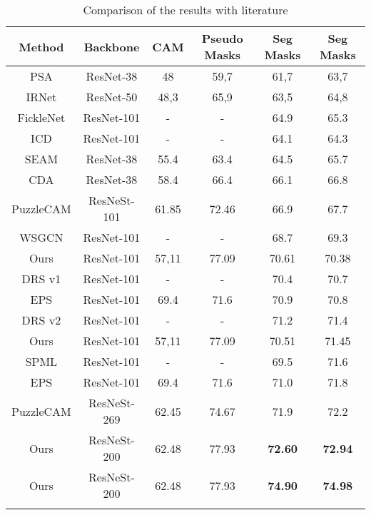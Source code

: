 \documentclass[sn-mathphys]{sn-jnl}
\theoremstyle{thmstyleone}
\theoremstyle{thmstyletwo}\newtheorem{example}{Example}\newtheorem{remark}{Remark}
\theoremstyle{thmstylethree}\newtheorem{definition}{Definition}
\begin{document}
\begin{table}[!ht]
\begin{center}
\begin{minipage}{\textwidth}
\caption{Comparison of the results with literature}\label{sota}\begin{tabular*}{\textwidth}{@{\extracolsep{\fill}}cccccc@{\extracolsep{\fill}}}
\toprule Method & Backbone  & CAM\footnotemark[1] & Pseudo Masks\footnotemark[1] & Seg Masks\footnotemark[2] & Seg Masks\footnotemark[3] \\
\midrule
PSA & ResNet-38  & 48 & 59,7 & 61,7 & 63,7 \\
IRNet & ResNet-50  & 48,3 & 65,9 & 63,5 & 64,8 \\
FickleNet & ResNet-101  & - & - & 64.9 & 65.3\\ 
ICD & ResNet-101  & - & - & 64.1 & 64.3\\
SEAM & ResNet-38  & 55.4 & 63.4 & 64.5 & 65.7\\
CDA & ResNet-38 & 58.4 & 66.4 & 66.1 & 66.8 \\
PuzzleCAM & ResNeSt-101 & 61.85 & 72.46 & 66.9 & 67.7 \\
WSGCN & ResNet-101 & - & - & 68.7 & 69.3 \\
Ours\footnotemark[4] & ResNet-101 & 57,11 & 77.09 & 70.61 & 70.38 \\
DRS v1\footnotemark[4] & ResNet-101 &  - & - & 70.4 & 70.7 \\
EPS\footnotemark[4] & ResNet-101 & 69.4 & 71.6 & 70.9  & 70.8 \\
DRS v2\footnotemark[4] & ResNet-101 & - & - & 71.2 & 71.4 \\
Ours\footnotemark[5] & ResNet-101 & 57,11 & 77.09 & 70.51 & 71.45 \\
SPML\footnotemark[4] & ResNet-101 & - & - & 69.5 & 71.6 \\
EPS\footnotemark[7] & ResNet-101 & 69.4 & 71.6 & 71.0  & 71.8 \\
PuzzleCAM & ResNeSt-269 & 62.45 & 74.67 & 71.9  & 72.2 \\
Ours\footnotemark[5] & ResNeSt-200 & 62.48 & 77.93 & \textbf{72.60} & \textbf{72.94} \\
Ours\footnotemark[6] & ResNeSt-200 & 62.48 & 77.93 & \textbf{74.90} & \textbf{74.98} \\
\botrule
\end{tabular*}
\end{minipage}
\end{center}
\end{table}
\end{document}
